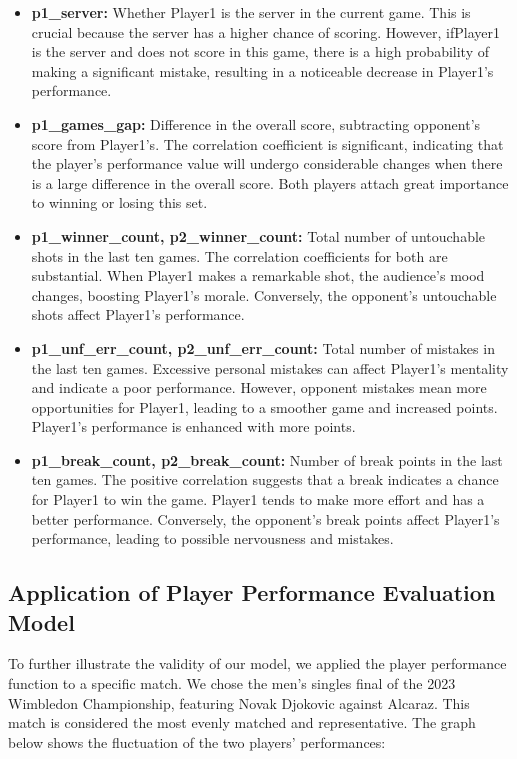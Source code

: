 \documentclass[UTF8]{ctexart} %
\begin{document}
\begin{itemize}
    \item \textbf{p1\_server:} Whether Player1 is the server in the current game. This is crucial because the 
    server has a higher chance of scoring. However, if\enspace Player1 is the server and does not score in this game, 
    there is a high probability of making a significant mistake, resulting in a noticeable decrease in Player1's 
    performance.
    \item \textbf{p1\_games\_gap:} Difference in the overall score, subtracting opponent's score from Player1's. 
    The correlation coefficient is significant, indicating that the player's performance value will undergo considerable 
    changes when there is a large difference in the overall score. Both players attach great importance to winning 
    or losing this set.
    \item \textbf{p1\_winner\_count, p2\_winner\_count:} Total number of untouchable shots in the last ten games. The 
    correlation coefficients for both are substantial. When Player1 makes a remarkable shot, the audience's mood 
    changes, boosting Player1's morale. Conversely, the opponent's untouchable shots affect Player1's performance.
    \item \textbf{p1\_unf\_err\_count, p2\_unf\_err\_count:} Total number of mistakes in the last ten games. 
    Excessive personal mistakes can affect Player1's mentality and indicate a poor performance. However, opponent 
    mistakes mean more opportunities for Player1, leading to a smoother game and increased points. Player1's performance 
    is enhanced with more points.
    \item \textbf{p1\_break\_count, p2\_break\_count:} Number of break points in the last ten games. The positive 
    correlation suggests that a break indicates a chance for Player1 to win the game. Player1 tends to make 
    more effort and has a better performance. Conversely, the opponent's break points affect Player1's performance, leading to 
    possible nervousness and mistakes.
\end{itemize}

\subsection{\textbf{Application of Player Performance Evaluation Model}}

To further illustrate the validity of our model, we applied the player performance function to a 
specific match. We chose the men's singles final of the 2023 Wimbledon Championship, featuring 
Novak Djokovic against Alcaraz. This match is considered the most evenly matched and 
representative. The graph below shows the fluctuation of the two players' performances:
\end{document}
